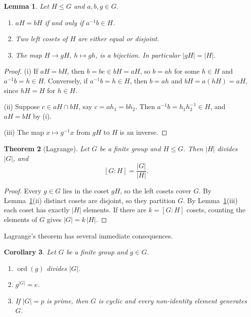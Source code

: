 \documentclass[11pt]{article}
\theoremstyle{plain}
\newtheorem{theorem}{Theorem}[section]
\newtheorem{lemma}[theorem]{Lemma}
\newtheorem{corollary}[theorem]{Corollary}
\theoremstyle{definition}
\theoremstyle{remark}
\DeclareMathOperator{\ord}{ord}
\begin{document}
\begin{lemma}\label{lem:cosets}
Let $H \le G$ and $a, b, g \in G$.
\begin{enumerate}[label=\textup{(\roman*)}]
  \item $aH = bH$ if and only if $a^{-1}b \in H$.
  \item Two left cosets of $H$ are either equal or disjoint.
  \item The map $H \to gH$, $h \mapsto gh$, is a bijection. In particular $|gH| = |H|$.
\end{enumerate}
\end{lemma}

\begin{proof}
(i) If $aH = bH$, then $b = be \in bH = aH$, so $b = ah$ for some $h \in H$ and $a^{-1}b = h \in H$. Conversely, if $a^{-1}b = h \in H$, then $b = ah$ and $bH = a(hH) = aH$, since $hH = H$ for $h \in H$.

(ii) Suppose $c \in aH \cap bH$, say $c = ah_1 = bh_2$. Then $a^{-1}b = h_1h_2^{-1} \in H$, and $aH = bH$ by (i).

(iii) The map $x \mapsto g^{-1}x$ from $gH$ to $H$ is an inverse.
\end{proof}

\begin{theorem}[Lagrange]\label{thm:lagrange}
Let $G$ be a finite group and $H \le G$. Then $|H|$ divides $|G|$, and
\[
  [G : H] = \frac{|G|}{|H|}.
\]
\end{theorem}

\begin{proof}
Every $g \in G$ lies in the coset $gH$, so the left cosets cover $G$. By Lemma~\ref{lem:cosets}(ii) distinct cosets are disjoint, so they partition $G$. By Lemma~\ref{lem:cosets}(iii) each coset has exactly $|H|$ elements. If there are $k = [G : H]$ cosets, counting the elements of $G$ gives $|G| = k\,|H|$.
\end{proof}

Lagrange's theorem has several immediate consequences.

\begin{corollary}\label{cor:lagrange}
Let $G$ be a finite group and $g \in G$.
\begin{enumerate}[label=\textup{(\alph*)}]
  \item $\ord(g)$ divides $|G|$.
  \item $g^{|G|} = e$.
  \item If $|G| = p$ is prime, then $G$ is cyclic and every non-identity element generates $G$.
\end{enumerate}
\end{corollary}
\end{document}

